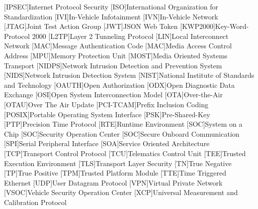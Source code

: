 \begin{acronym}
[IPSEC]{Internet Protocol Security}
[ISO]{International Organization for Standardization}
[IVI]{In-Vehicle Infotainment}
[IVN]{In-Vehicle Network}
[JTAG]{Joint Test Action Group}
[JWT]{JSON Web Token}
[KWP2000]{Key-Word-Protocol 2000}
[L2TP]{Layer 2 Tunneling Protocol}
[LIN]{Local Interconnect Network}
[MAC]{Message Authentication Code} 	%
[MAC]{Media Access Control Address}	%
[MPU]{Memory Protection Unit}
[MOST]{Media Oriented Systems Transport}
[NIDPS]{Network Intrusion Detection and Prevention System}
[NIDS]{Network Intrusion Detection System}
[NIST]{National Institute of Standards and Technology}
[OAUTH]{Open Authorization}
[ODX]{Open Diagnostic Data Exchange}
[OSI]{Open System Interconnection Model}
[OTA]{Over-the-Air}
[OTAU]{Over The Air Update}
[PCI-TCAM]{Prefix Inclusion Coding} 				%
[POSIX]{Portable Operating System Interface}
[PSK]{Pre-Shared-Key}
[PTP]{Precision Time Protocol}
[RTE]{Runtime Environment}
[SOC]{System on a Chip}                      %
[SOC]{Security Operation Center}             %
[SOC]{Secure Onboard Communication}          %
[SPI]{Serial Peripheral Interface}
[SOA]{Service Oriented Architecture}
[TCP]{Transport Control Protocol}
[TCU]{Telematics Control Unit}
[TEE]{Trusted Execution Environment}
[TLS]{Transport Layer Security}
[TN]{True Negative}
[TP]{True Positive}
[TPM]{Trusted Platform Module}
[TTE]{Time Triggered Ethernet}		%
[UDP]{User Datagram Protocol}
[VPN]{Virtual Private Network}
[VSOC]{Vehicle Security Operation Center}
[XCP]{Universal Measurement and Calibration Protocol}
\end{acronym}
